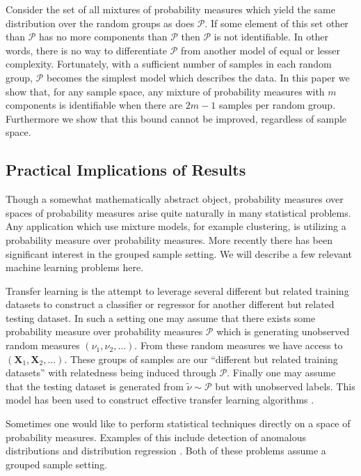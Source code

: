 \documentclass{article} %
\def\l{\left}
\def\r{\right}
\def\sP{\mathscr{P}}
\def\bX{\mathbf{X}}
\theoremstyle{definition}
\begin{document}
Consider the set of all mixtures of probability measures which yield the same distribution over the random groups as does $\sP$. If some element of this set other than $\sP$ has no more components than $\sP$ then $\sP$ is not identifiable. In other words, there is no way to differentiate $\sP$ from another model of equal or lesser complexity. Fortunately, with a sufficient number of samples in each random group, $\sP$ becomes the simplest model which describes the data. In this paper we show that, for any sample space, any mixture of probability measures with $m$ components is identifiable when there are $2m-1$ samples per random group. Furthermore we show that this bound cannot be improved, regardless of sample space. 
\subsection{Practical Implications of Results}
Though a somewhat mathematically abstract object, probability measures over spaces of probability measures arise quite naturally in many statistical problems. Any application which use mixture models, for example clustering, is utilizing a probability measure over probability measures. More recently there has been significant interest in the grouped sample setting. We will describe a few relevant machine learning problems here.

Transfer learning is the attempt to leverage several different but related training datasets to construct a classifier or regressor for another different but related testing dataset. In such a setting one may assume that there exists some probability measure over probability measures $\sP$ which is generating unobserved random measures $\l(\nu_1, \nu_2,\ldots\r)$. From these random measures we have access to $\l(\bX_1, \bX_2,\ldots\r)$. These groups of samples are our ``different but related training datasets'' with relatedness being induced through $\sP$. Finally one may assume that the testing dataset is generated from $\tilde{\nu}\sim \sP$ but with unobserved labels. This model has been used to construct effective transfer learning algorithms \cite{blanchard11,maurer13}.

Sometimes one would like to perform statistical techniques directly on a space of probability measures. Examples of this include detection of anomalous distributions \cite{muandet13} and distribution regression \cite{poczos13,szabo14}. Both of these problems assume a grouped sample setting.
\end{document}
